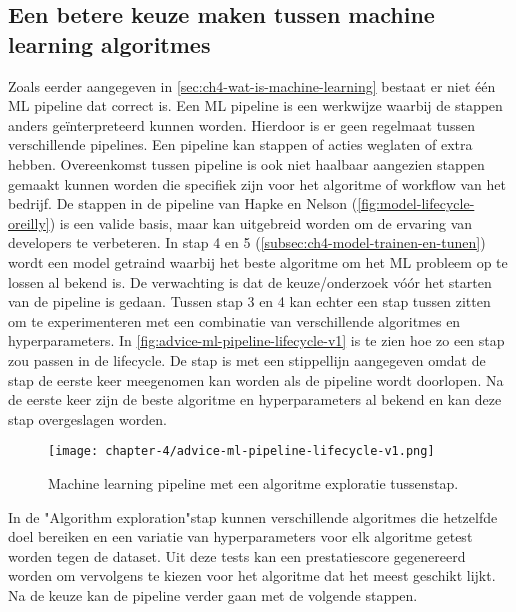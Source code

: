 \subsection{Een betere keuze maken tussen machine learning algoritmes}\label{subsec:ch4-een-betere-keuze-maken-tussen-machine-learning-algoritmes}
Zoals eerder aangegeven in \autoref{sec:ch4-wat-is-machine-learning} bestaat er niet één ML pipeline dat correct is. Een ML pipeline is een werkwijze waarbij de stappen anders geïnterpreteerd kunnen worden. Hierdoor is er geen regelmaat tussen verschillende pipelines. Een pipeline kan stappen of acties weglaten of extra hebben. Overeenkomst tussen pipeline is ook niet haalbaar aangezien stappen gemaakt kunnen worden die specifiek zijn voor het algoritme of workflow van het bedrijf. De stappen in de pipeline van Hapke en Nelson (\autoref{fig:model-lifecycle-oreilly}) is een valide basis, maar kan uitgebreid worden om de ervaring van developers te verbeteren. In stap 4 en 5 (\autoref{subsec:ch4-model-trainen-en-tunen}) wordt een model getraind waarbij het beste algoritme om het ML probleem op te lossen al bekend is. De verwachting is dat de keuze/onderzoek vóór het starten van de pipeline is gedaan. Tussen stap 3 en 4 kan echter een stap tussen zitten om te experimenteren met een combinatie van verschillende algoritmes en hyperparameters. In \autoref{fig:advice-ml-pipeline-lifecycle-v1} is te zien hoe zo een stap zou passen in de lifecycle. De stap is met een stippellijn aangegeven omdat de stap de eerste keer meegenomen kan worden als de pipeline wordt doorlopen. Na de eerste keer zijn de beste algoritme en hyperparameters al bekend en kan deze stap overgeslagen worden.

\newpage

\begin{figure}[hbt!]
  \centering
  \texttt{[image: chapter-4/advice-ml-pipeline-lifecycle-v1.png]}
  \caption{Machine learning pipeline met een algoritme exploratie tussenstap.}
  \label{fig:advice-ml-pipeline-lifecycle-v1}
\end{figure}

In de "Algorithm exploration"\space stap kunnen verschillende algoritmes die hetzelfde doel bereiken en een variatie van hyperparameters voor elk algoritme getest worden tegen de dataset. Uit deze tests kan een prestatiescore gegenereerd worden om vervolgens te kiezen voor het algoritme dat het meest geschikt lijkt. Na de keuze kan de pipeline verder gaan met de volgende stappen.

